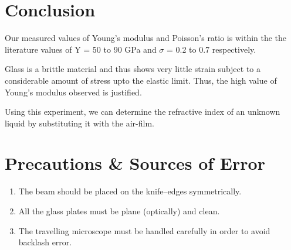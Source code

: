 \section{Conclusion}
Our measured values of Young's modulus and Poisson's ratio is within the the literature values of Y = 50 to 90 GPa and $\sigma$ = 0.2 to 0.7 respectively.

Glass is a brittle material and thus shows very little strain subject to a considerable amount of stress upto the elastic limit. Thus, the high value of Young's modulus observed is justified.

Using this experiment, we can determine the refractive index of an unknown liquid by substituting it with the air-film.

\section{Precautions \& Sources of Error}
\begin{enumerate}
    \item The beam should be placed on the knife–edges symmetrically.
    \item All the glass plates must be plane (optically) and clean.
    \item The travelling microscope must be handled carefully in order to avoid backlash error.
\end{enumerate}